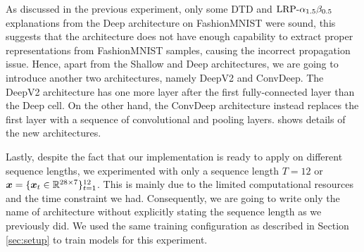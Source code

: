 As discussed in the previous experiment, only some DTD and $\text{LRP-}\alpha_{1.5}\beta_{0.5}$ explanations from the Deep architecture on FashionMNIST were sound, this suggests that the architecture does not have enough capability to extract proper representations from FashionMNIST samples, causing the incorrect propagation issue. Hence, apart from the Shallow and Deep architectures, we are going to  introduce another two architectures, namely DeepV2 and ConvDeep. The DeepV2 architecture has one more layer after the first fully-connected layer than the Deep cell. On the other hand, the ConvDeep architecture instead replaces the first layer with  a sequence of convolutional and pooling layers. \addfigure{\ref{fig:deep_conv_arch}} shows details of the new architectures.




\begin{figure}[!htb]
\centering

     \hfill

\label{fig:deep_conv_arch}
\end{figure}

Lastly, despite the fact that  our implementation is ready to apply on different sequence lengths,  we experimented with only a sequence length $T=12$ or $\boldsymbol{x} = \{ \boldsymbol{x}_t \in \mathbb{R}^{28 \times 7}\}_{t=1}^{12}$. This is mainly due to the limited computational resources and the time constraint we had. Consequently, we are going to write only the name of architecture without explicitly stating the sequence length as we previously did.  We used the same training configuration as described in Section \ref{sec:setup} to train models for this experiment.


